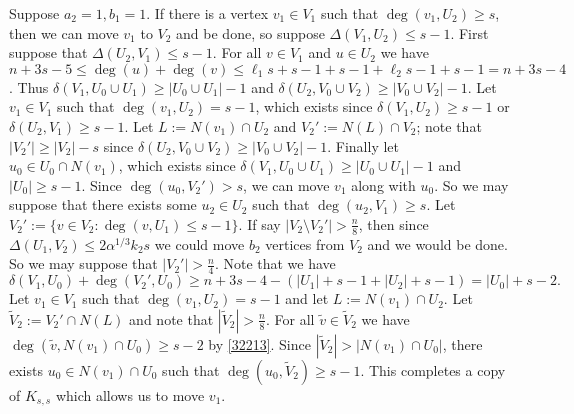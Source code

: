 \documentclass[oneside,12pt]{memoir}
\begin{document}
Suppose $a_2=1, b_1=1$.  If there is a vertex $v_1\in V_1$ such that $\deg(v_1, U_2)\geq s$, then we can move $v_1$ to $V_2$ and be done, so suppose $\Delta(V_1, U_2)\leq s-1$.  First suppose that $\Delta(U_2, V_1)\leq s-1$.  For all $v\in V_1$ and $u\in U_2$ we have $n+3s-5\leq \deg(u)+\deg(v)\leq \ell_1s+s-1+s-1+\ell_2s-1+s-1=n+3s-4$.  Thus $\delta(V_1, U_0\cup U_1)\geq |U_0\cup U_1|-1$ and $\delta(U_2, V_0\cup V_2)\geq |V_0\cup V_2|-1$.  Let $v_1\in V_1$ such that $\deg(v_1, U_2)= s-1$, which exists since $\delta(V_1, U_2)\geq s-1$ or $\delta(U_2, V_1)\geq s-1$.  Let $L:=N(v_1)\cap U_2$ and $V_2':=N(L)\cap V_2$; note that $|V_2'|\geq |V_2|-s$ since $\delta(U_2, V_0\cup V_2)\geq |V_0\cup V_2|-1$.  Finally let $u_0\in U_0\cap N(v_1)$, which exists since $\delta(V_1, U_0\cup U_1)\geq |U_0\cup U_1|-1$ and $|U_0|\geq s-1$.  Since $\deg(u_0, V_2')>s$, we can move $v_1$ along with $u_0$.  So we may suppose that there exists some $u_2\in U_2$ such that $\deg(u_2, V_1)\geq s$.  Let $V_2':=\{v\in V_2:\deg(v, U_1)\leq s-1\}$.  If say $|V_2\setminus V_2'|>\frac{n}{8}$, then since $\Delta(U_1, V_2)\leq 2\alpha^{1/3}k_2s$ we could move $b_2$ vertices from $V_2$ and we would be done. So we may suppose that $|V_2'|>\frac{n}{4}$.  Note that we have
\begin{equation}\label{32213}
\delta(V_1, U_0)+\deg(V_2', U_0)\geq n+3s-4-(|U_1|+s-1+|U_2|+s-1)=|U_0|+s-2.
\end{equation}
Let $v_1\in V_1$ such that $\deg(v_1, U_2)=s-1$ and let $L:=N(v_1)\cap U_2$.  Let $\tilde{V}_2:=V_2'\cap N(L)$ and note that $|\tilde{V}_2|>\frac{n}{8}$.  For all $\tilde{v}\in \tilde{V}_2$ we have $\deg(\tilde{v}, N(v_1)\cap U_0)\geq s-2$ by \eqref{32213}.  Since $|\tilde{V}_2|>|N(v_1)\cap U_0|$, there exists $u_0\in N(v_1)\cap U_0$ such that $\deg(u_0, \tilde{V}_2)\geq s-1$.  This completes a copy of $K_{s,s}$ which allows us to move $v_1$.
\end{document}
